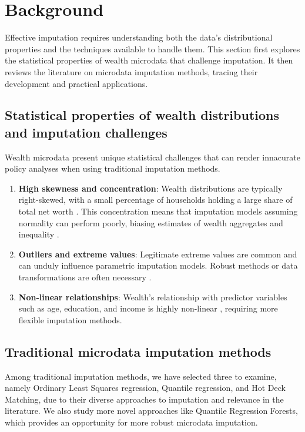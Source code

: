 \section{Background}

Effective imputation requires understanding both the data's distributional properties and the techniques available to handle them. This section first explores the statistical properties of wealth microdata that challenge imputation. It then reviews the literature on microdata imputation methods, tracing their development and practical applications.

\subsection{Statistical properties of wealth distributions and imputation challenges}

Wealth microdata present unique statistical challenges that can render innacurate policy analyses when using traditional imputation methods.

\begin{enumerate}
    \item \textbf{High skewness and concentration}: Wealth distributions are typically right-skewed, with a small percentage of households holding a large share of total net worth \citep{chen2020imputation}. This concentration means that imputation models assuming normality can perform poorly, biasing estimates of wealth aggregates and inequality \citep{lun2019multiple}.
    \item \textbf{Outliers and extreme values}: Legitimate extreme values are common and can unduly influence parametric imputation models. Robust methods or data transformations are often necessary \citep{chen2020imputation}. 
    \item \textbf{Non-linear relationships}: Wealth's relationship with predictor variables such as age, education, and income is highly non-linear \citep{zillow2024quantile}, requiring more flexible imputation methods.
\end{enumerate}

\subsection{Traditional microdata imputation methods}

Among traditional imputation methods, we have selected three to examine, namely Ordinary Least Squares regression, Quantile regression, and Hot Deck Matching, due to their diverse approaches to imputation and relevance in the literature. We also study more novel approaches like Quantile Regression Forests, which provides an opportunity for more robust microdata imputation.

